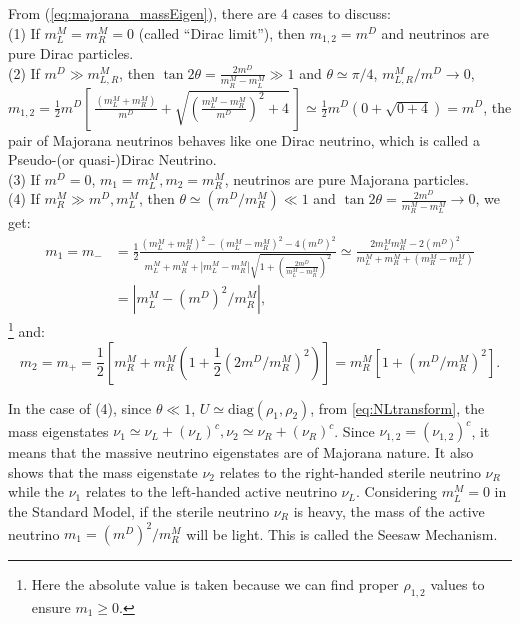 From (\ref{eq:majorana_massEigen}), there are 4 cases to discuss:\\
(1) If $m_L^M=m_R^M=0$ (called ``Dirac limit''), then $m_{1,2}=m^D$ and neutrinos are pure Dirac particles.\\
(2) If $m^D\gg m^M_{L,R}$, then $\tan 2\theta=\frac{2m^D}{m^M_R-m^M_L}\gg 1$ and $\theta\simeq \pi/4$, ${m_{L,R}^M}/{m^D}\to 0$, $m_{1,2}=\frac{1}{2}m^D[~\frac{(m_L^M+m_R^M)}{m^D}+\sqrt{(\frac{m^M_L-m^M_R}{m^D})^2+4}~]\simeq\frac{1}{2}m^D(0+\sqrt{0+4})= m^D$, the pair of Majorana neutrinos behaves like one Dirac neutrino, which is called a Pseudo-(or quasi-)Dirac Neutrino.
\\
(3) If $m^D=0$, $m_1=m^M_L, m_2=m^M_R$, neutrinos are pure Majorana particles.\\
(4) If $m_R^M\gg m^D, m_L^M$, then $\theta\simeq({m^D}/{m_R^M})\ll 1$ and $\tan 2\theta=\frac{2m^D}{m^M_R-m^M_L}\to 0$, we get:
\begin{equation}
\begin{aligned}
m_1=m_-&=\frac{1}{2}\frac{(m^M_L+m^M_R)^2-(m^M_L-m^M_R)^2-4(m^D)^2}{m^M_L+m^M_R+|m^M_L-m^M_R|\sqrt{1+(\frac{2m^D}{m^M_L-m^M_R})^2}}\simeq 
\frac{2m^M_Lm^M_R-2(m^D)^2}{m_L^M+m_R^M+(m_R^M-m_L^M)}\\
&=|m^M_L-{(m^D)^2}/{m^M_R}|,
\end{aligned}
\end{equation}\footnote{Here the absolute value is taken because we can find proper $\rho_{1,2}$ values to ensure $m_1\geq 0$.}
and:
\begin{equation}
m_2=m_+=\frac{1}{2}[m^M_R+m^M_R(1+\frac{1}{2}({2m^D}/{m^M_R})^2)]=m^M_R[1+({m^D}/{m^M_R})^2].
\end{equation}

In the case of (4), since $\theta\ll 1$, $U\simeq \mathrm{diag}(\rho_1, \rho_2)$, from \ref{eq:NLtransform}, the mass eigenstates $\nu_1\simeq \nu_L+(\nu_L)^c, \nu_2\simeq \nu_R+(\nu_R)^c$. Since $\nu_{1,2}=(\nu_{1,2})^c$, it means that the massive neutrino eigenstates are of Majorana nature. It also shows that the mass eigenstate $\nu_2$ relates to the right-handed sterile neutrino $\nu_R$ while the $\nu_1$ relates to the left-handed active neutrino $\nu_L$. Considering $m_L^M = 0$ in the Standard Model\cite{akhmedov2014majorana}, if the sterile neutrino $\nu_R$ is heavy, the mass of the active neutrino $m_1= {(m^D)^2}/{m^M_R}$ will be light. This is called the Seesaw Mechanism. 


